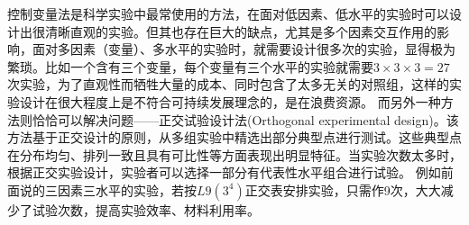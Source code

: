 控制变量法是科学实验中最常使用的方法，在面对低因素、低水平的实验时可以设计出很清晰直观的实验。但其也存在巨大的缺点，尤其是多个因素交互作用的影响，面对多因素（变量）、多水平的实验时，就需要设计很多次的实验，显得极为繁琐。比如一个含有三个变量，每个变量有三个水平的实验就需要$ 3\times 3 \times 3=27$次实验，为了直观性而牺牲大量的成本、同时包含了太多无关的对照组，这样的实验设计在很大程度上是不符合可持续发展理念的，是在浪费资源。
而另外一种方法则恰恰可以解决问题——正交试验设计法(Orthogonal experimental design)。该方法基于正交设计的原则，从多组实验中精选出部分典型点进行测试。这些典型点在分布均匀、排列一致且具有可比性等方面表现出明显特征\cite{wangxueshen}。当实验次数太多时，根据正交实验设计，实验者可以选择一部分有代表性水平组合进行试验。 例如前面说的三因素三水平的实验，若按$ L9(3^4) $正交表安排实验，只需作9次，大大减少了试验次数，提高实验效率、材料利用率。


